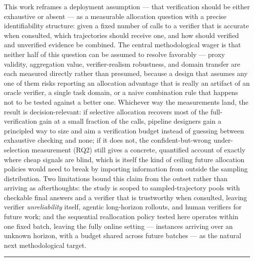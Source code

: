 \documentclass[11pt]{article}
\begin{document}
This work reframes a deployment assumption --- that verification should be either exhaustive or absent --- as a measurable allocation question with a precise identifiability structure: given a fixed number of calls to a verifier that is accurate when consulted, which trajectories should receive one, and how should verified and unverified evidence be combined. The central methodological wager is that neither half of this question can be assumed to resolve favorably --- proxy validity, aggregation value, verifier-realism robustness, and domain transfer are each measured directly rather than presumed, because a design that assumes any one of them risks reporting an allocation advantage that is really an artifact of an oracle verifier, a single task domain, or a naive combination rule that happens not to be tested against a better one. Whichever way the measurements land, the result is decision-relevant: if selective allocation recovers most of the full-verification gain at a small fraction of the calls, pipeline designers gain a principled way to size and aim a verification budget instead of guessing between exhaustive checking and none; if it does not, the confident-but-wrong under-selection measurement (RQ2) still gives a concrete, quantified account of exactly where cheap signals are blind, which is itself the kind of ceiling future allocation policies would need to break by importing information from outside the sampling distribution. Two limitations bound this claim from the outset rather than arriving as afterthoughts: the study is scoped to sampled-trajectory pools with checkable final answers and a verifier that is trustworthy when consulted, leaving verifier \emph{unreliability} itself, agentic long-horizon rollouts, and human verifiers for future work; and the sequential reallocation policy tested here operates within one fixed batch, leaving the fully online setting --- instances arriving over an unknown horizon, with a budget shared across future batches --- as the natural next methodological target.

\vspace{1em}
\hrule
\vspace{1em}
\end{document}
